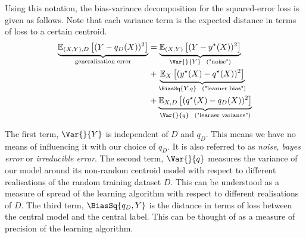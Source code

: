 \documentclass[
	twoside=false, %
]{kaobook}
\begin{document}
Using this notation, the bias-variance decomposition for the squared-error loss is given as follows.
Note that each variance term is the expected distance in terms of loss to a certain centroid.
\begin{align} 
  \begin{split}
\label{thm:sqerr-bias-variance-decomp}
\underbrace{
\mathbb{E}_{(X,Y), D}\left[ (Y-q_{D}(X))^2 \right]  
}_{\text{generalisation error}}
&= \underbrace{\mathbb{E}_{(X,Y)}\left[ (Y-y^\star(X))^2 \right]   }_{\Var{}{Y} ~~ \text{("noise")}} \\
&+ \underbrace{ \mathbb{E}_{X}\left[  (y^\star(X) - q^\star(X))^2\right]  }_{\BiasSq{Y, q} ~~ \text{("learner bias")}} \\
&+ \underbrace{\mathbb{E}_{X, D}\left[ (q^\star(X) - q_{D}(X))^2 \right]   }_{\Var{}{q} ~~ \text{("learner variance")}}
  \end{split}
\end{align}

The first term, $\Var{}{Y}$ is independent of $D$ and $q_{D}$. This means we have no means of influencing it with our choice of $q_{D}$.
It is also referred to as \textit{noise}, \textit{bayes error} or \textit{irreducible error}. 
The second term, $\Var{}{q}$ measures the variance of our model around its non-random centroid model with respect to different realisations of the random training dataset $D$. This can be understood as a measure of spread of the learning algorithm with respect to different realisations of $D$.
The third term, $\BiasSq{q_{D}, Y}$ is the distance in terms of loss between the central model and the central label. This can be thought of as a measure of precision of the learning algorithm. 
\end{document}
